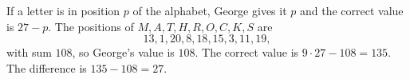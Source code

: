 If a letter is in position $p$ of the alphabet, George gives it $p$ and the correct value is $27-p$. The positions of $M,A,T,H,R,O,C,K,S$ are
\[
13,1,20,8,18,15,3,11,19,
\]
with sum $108$, so George's value is $108$. The correct value is $9\cdot27-108=135$. The difference is $135-108=\boxed{27}$.
